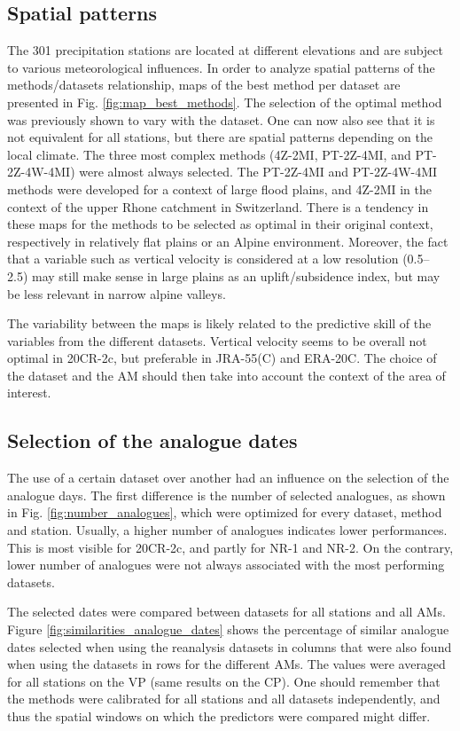\documentclass{ametsoc}
\begin{document}
\subsection{Spatial patterns}

The 301 precipitation stations are located at different elevations and are subject to various meteorological influences. In order to analyze spatial patterns of the methods/datasets relationship, maps of the best method per dataset are presented in Fig. \ref{fig:map_best_methods}. The selection of the optimal method was previously shown to vary with the dataset. One can now also see that it is not equivalent for all stations, but there are spatial patterns depending on the local climate. The three most complex methods (4Z-2MI, PT-2Z-4MI, and PT-2Z-4W-4MI) were almost always selected. The PT-2Z-4MI and PT-2Z-4W-4MI methods were developed for a context of large flood plains, and 4Z-2MI in the context of the upper Rhone catchment in Switzerland. There is a tendency in these maps for the methods to be selected as optimal in their original context, respectively in relatively flat plains or an Alpine environment. Moreover, the fact that a variable such as vertical velocity is considered at a low resolution (0.5\degree -- 2.5\degree) may still make sense in large plains as an uplift/subsidence index, but may be less relevant in narrow alpine valleys. 

The variability between the maps is likely related to the predictive skill of the variables from the different datasets. Vertical velocity seems to be overall not optimal in 20CR-2c, but preferable in JRA-55(C) and ERA-20C. The choice of the dataset and the AM should then take into account the context of the area of interest.


\subsection{Selection of the analogue dates}

The use of a certain dataset over another had an influence on the selection of the analogue days. The first difference is the number of selected analogues, as shown in Fig. \ref{fig:number_analogues}, which were optimized for every dataset, method and station. Usually, a higher number of analogues indicates lower performances. This is most visible for 20CR-2c, and partly for NR-1 and NR-2. On the contrary, lower number of analogues were not always associated with the most performing datasets.

The selected dates were compared between datasets for all stations and all AMs. Figure \ref{fig:similarities_analogue_dates} shows the percentage of similar analogue dates selected when using the reanalysis datasets in columns that were also found when using the datasets in rows for the different AMs. The values were averaged for all stations on the VP (same results on the CP). One should remember that the methods were calibrated for all stations and all datasets independently, and thus the spatial windows on which the predictors were compared might differ.
\end{document}
